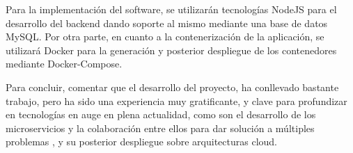 Para la implementación del software, se utilizarán tecnologías NodeJS
para el desarrollo del backend dando soporte al mismo mediante una
base de datos MySQL. Por otra parte, en cuanto a la contenerización de
la aplicación, se utilizará Docker para la generación y posterior
despliegue de los contenedores mediante Docker-Compose.

Para concluir, comentar que el desarrollo del proyecto, ha conllevado
bastante trabajo, pero ha sido una experiencia muy gratificante, y
clave para profundizar en tecnologías en auge en plena actualidad,
como son el desarrollo de los microservicios y la colaboración entre
ellos para dar solución a múltiples problemas , y su posterior
despliegue sobre arquitecturas cloud.

